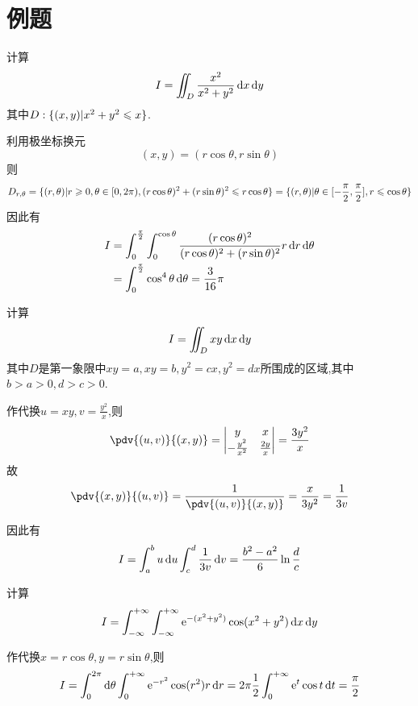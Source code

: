 \section{例题}

\begin{example}
    计算$$I = \iint_D \frac{x^2}{x^2 + y^2} \operatorname{d\!} x \operatorname{d\!} y$$
    其中$D:\{ (x,y) | x^2 + y^2 \leqslant x\}$.
\end{example}

\begin{solution}
    利用极坐标换元$$(x,y) = (r \cos \theta,r \sin \theta)$$
    则
    $$D_{r,\theta} = \{ (r,\theta) | r \geqslant 0, \theta \in [0,2\pi) , (r \cos \theta)^2 + (r \sin \theta)^2 \leqslant r \cos \theta \} = \{ (r,\theta) | \theta \in [-\frac{\pi}{2},\frac{\pi}{2}], r \leqslant \cos \theta \}$$
    因此有
    \begin{align*}
        I &= \int_0^{\frac{\pi}{2}} \int_0^{\cos \theta} \frac{(r \cos \theta)^2}{(r \cos \theta)^2 + (r \sin \theta)^2} r \operatorname{d\!} r \operatorname{d\!} \theta\\
        &= \int_0^\frac{\pi}{2} \cos^4 \theta \operatorname{d\!} \theta = \frac{3}{16} \pi
    \end{align*}
\end{solution}

\begin{example}
    计算$$I = \iint_D xy \operatorname{d\!} x \operatorname{d\!} y$$其中$D$是第一象限中$xy = a, xy = b, y^2 = cx, y^2 = dx$所围成的区域,其中$b > a > 0, d > c > 0$.
\end{example}

\begin{solution}
    作代换$u = xy, v = \frac{y^2}{x}$,则
    $$\pdv{(u,v)}{(x,y)} = \begin{vmatrix}
        y & x\\
        -\frac{y^2}{x^2} & \frac{2y}{x}
    \end{vmatrix} = \frac{3y^2}{x}$$
    故
    $$\pdv{(x,y)}{(u,v)} = \frac{1}{\pdv{(u,v)}{(x,y)}} = \frac{x}{3y^2} = \frac{1}{3v}$$

    因此有
    $$I = \int_a^b u \operatorname{d\!} u \int_c^d \frac{1}{3v} \operatorname{d\!} v = \frac{b^2 - a^2}{6} \ln \frac{d}{c}$$

\end{solution}


\begin{example}
    计算$$I = \int_{- \infty}^{+ \infty} \int_{- \infty}^{+ \infty}\mathrm{e}^{-(x^2 + y^2)} \cos(x^2 + y^2) \operatorname{d\!} x \operatorname{d\!} y$$
\end{example}

\begin{solution}
    作代换$x = r \cos \theta, y = r \sin \theta$,则
    $$I = \int_0^{2\pi} \operatorname{d\!} \theta \int_0^{+\infty} \mathrm{e}^{-r^2} \cos(r^2) r \operatorname{d\!} r =2 \pi \frac{1}{2} \int_0^{+\infty} \mathrm{e}^t \cos t \operatorname{d\!} t = \frac{\pi}{2}$$
\end{solution}



